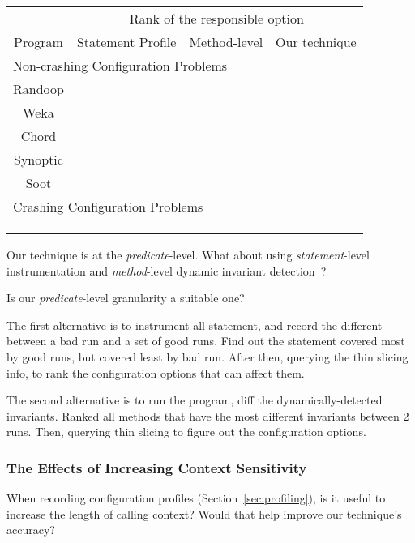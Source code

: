 \begin{table}[t]
\setlength{\tabcolsep}{.54\tabcolsep}
\begin{tabular}{|c|c|c|c|}
\hline
 & \multicolumn{3}{|c|}{Rank of the responsible option} \\
\cline{2-4}
 Program & Statement Profile& Method-level & Our technique \\
 \hline
\hline
\multicolumn{4}{|l|}{Non-crashing Configuration Problems}   \\
 \hline
 Randoop & & &  \\
\hline
 Weka &  & &  \\
\hline
 Chord & & &  \\
\hline
 Synoptic & & &  \\
\hline
 Soot &  &  &  \\
\hline
\hline
\multicolumn{4}{|l|}{Crashing Configuration Problems}   \\
\hline
& & & \\
\hline
& & & \\
\hline
& & & \\
\hline
\end{tabular}

\end{table}

Our technique is at the \textit{predicate}-level. What about using
\textit{statement}-level instrumentation and \textit{method}-level dynamic invariant detection~\cite{Ernst:1999}?

Is our \textit{predicate}-level granularity a suitable one?

The first alternative is to instrument all statement, and record the different between a bad run and
a set of good runs. Find out the statement covered most by good runs, but covered least by bad run.
After then, querying the thin slicing info, to rank the configuration options that can affect them.


The second alternative is to run the program, diff the dynamically-detected invariants. Ranked all
methods that have the most different invariants between 2 runs. Then, querying thin slicing to
figure out the configuration options.

\subsubsection{The Effects of Increasing Context Sensitivity}

When recording configuration profiles (Section~\ref{sec:profiling}), is it useful
to increase the length of calling context? Would that help improve our technique's accuracy?

